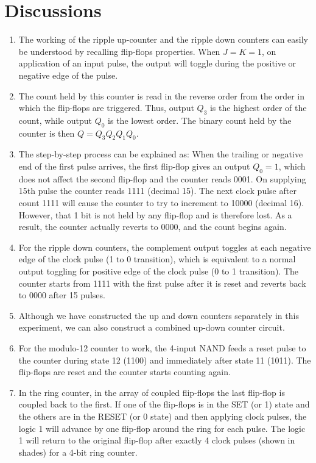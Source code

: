 \section{Discussions}
\begin{enumerate}
    \item The working of the ripple up-counter and the ripple down counters can easily be understood by recalling flip-flops properties. When $J = K = 1$, on application of an input pulse, the output will toggle during the positive or negative edge of the pulse.
    \item The count held by this  counter is read in the reverse order from the order in which the flip-flops are triggered.  Thus, output $Q_3$ is the highest order of the count, while output $Q_0$ is the lowest order. The  binary count held by the counter is then $Q = Q_3Q_2Q_1Q_0$.
    \item The step-by-step process can be explained as: When the trailing or negative end of the first pulse arrives, the first flip-flop gives an output $Q_0 = 1$, which does not affect the second flip-flop and the counter reads 0001. On supplying 15th pulse the counter reads 1111 (decimal 15). The next clock pulse after count 1111 will cause the counter to try to increment to 10000 (decimal 16). However, that 1 bit is not held by any flip-flop and is therefore lost. As a result, the counter actually reverts to 0000, and the count begins again.
    \item For the ripple down counters, the complement output toggles at each negative edge of the clock pulse (1 to 0 transition), which is equivalent to a normal output toggling for positive edge of the clock pulse (0 to 1 transition). The counter starts from 1111 with the first pulse after it is reset and reverts back to 0000 after 15 pulses. 
    \item Although we have constructed the up and down counters separately in this experiment, we can also construct a combined up-down counter circuit.
    \item For the modulo-12 counter to work, the 4-input NAND feeds a reset pulse to the counter during state 12 (1100) and immediately after state 11 (1011). The flip-flops are reset and the counter starts counting again.
    \item In the ring counter, in the array of coupled flip-flops the last flip-flop is coupled back to the first. If one of the flip-flops is in the SET (or 1) state and the others are in the RESET (or 0 state) and then applying clock pulses, the logic 1 will advance by one flip-flop around the ring for each pulse. The logic 1 will return to the original flip-flop after exactly 4 clock pulses (shown in shades) for a 4-bit ring counter.

\end{enumerate}
